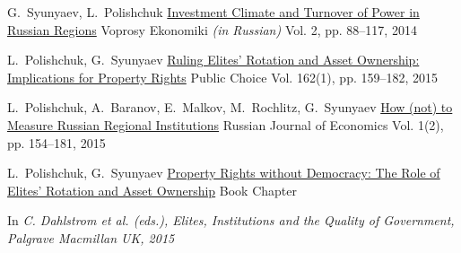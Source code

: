 
\begin{cventries}

  \cventry
    {G.~Syunyaev, L.~Polishchuk} %
    {\href{https://ideas.repec.org/a/nos/voprec/2014-02-5.html}{Investment Climate and Turnover of Power in Russian Regions}} %
    {Voprosy Ekonomiki \emph{(in Russian)}} %
    {Vol. 2, pp. 88--117, 2014} %
    {
    }

  \cventry
    {L.~Polishchuk, G.~Syunyaev} %
    {\href{http://dx.doi.org/10.1007/s11127-014-0210-2}{Ruling Elites' Rotation and Asset Ownership: Implications for Property Rights}} %
    {Public Choice} %
    {Vol. 162(1), pp. 159--182, 2015} %
    {
    }

  \cventry
    {L.~Polishchuk, A.~Baranov, E.~Malkov, M.~Rochlitz, G.~Syunyaev} %
    {\href{http://dx.doi.org/10.1016/j.ruje.2015.11.005}{How (not) to Measure Russian Regional Institutions}} %
    {Russian Journal of Economics} %
    {Vol. 1(2), pp. 154--181, 2015} %
    {
    }

  \cventry
    {L.~Polishchuk, G.~Syunyaev} %
    {\href{http://dx.doi.org/10.1057/9781137556288.0018}{Property Rights without Democracy: The Role of Elites' Rotation and Asset Ownership}} %
    {Book Chapter} %
    {} %
    {
      \begin{cvitems} %
        \item {In \emph{C. Dahlstrom et al. (eds.), Elites, Institutions and the Quality of Government, Palgrave Macmillan UK, 2015}}
      \end{cvitems}
    }


\end{cventries}
